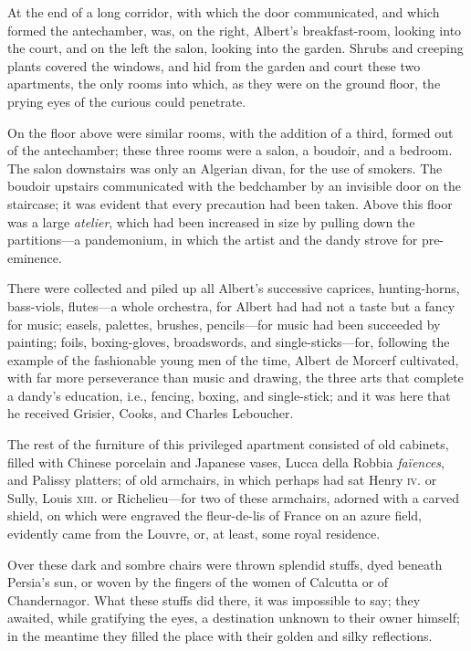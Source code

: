  At the end of a long corridor, with which the door communicated, and which formed the antechamber, was, on the right, Albert's breakfast-room, looking into the court, and on the left the salon, looking into the garden. Shrubs and creeping plants covered the windows, and hid from the garden and court these two apartments, the only rooms into which, as they were on the ground floor, the prying eyes of the curious could penetrate. 

 On the floor above were similar rooms, with the addition of a third, formed out of the antechamber; these three rooms were a salon, a boudoir, and a bedroom. The salon downstairs was only an Algerian divan, for the use of smokers. The boudoir upstairs communicated with the bedchamber by an invisible door on the staircase; it was evident that every precaution had been taken. Above this floor was a large \textit{atelier}, which had been increased in size by pulling down the partitions—a pandemonium, in which the artist and the dandy strove for pre-eminence. 

 There were collected and piled up all Albert's successive caprices, hunting-horns, bass-viols, flutes—a whole orchestra, for Albert had had not a taste but a fancy for music; easels, palettes, brushes, pencils—for music had been succeeded by painting; foils, boxing-gloves, broadswords, and single-sticks—for, following the example of the fashionable young men of the time, Albert de Morcerf cultivated, with far more perseverance than music and drawing, the three arts that complete a dandy's education, i.e., fencing, boxing, and single-stick; and it was here that he received Grisier, Cooks, and Charles Leboucher. 

 The rest of the furniture of this privileged apartment consisted of old cabinets, filled with Chinese porcelain and Japanese vases, Lucca della Robbia \textit{faïences}, and Palissy platters; of old armchairs, in which perhaps had sat Henry \textsc{iv.} or Sully, Louis \textsc{xiii.} or Richelieu—for two of these armchairs, adorned with a carved shield, on which were engraved the fleur-de-lis of France on an azure field, evidently came from the Louvre, or, at least, some royal residence. 

 Over these dark and sombre chairs were thrown splendid stuffs, dyed beneath Persia's sun, or woven by the fingers of the women of Calcutta or of Chandernagor. What these stuffs did there, it was impossible to say; they awaited, while gratifying the eyes, a destination unknown to their owner himself; in the meantime they filled the place with their golden and silky reflections. 

